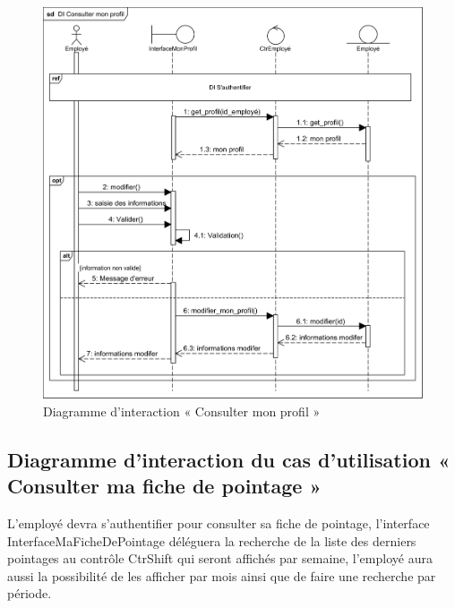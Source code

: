 \begin{figure}[h!]
    \centering
    \includegraphics[scale=0.86]{images/DS/consulter_mon_profile}
    \caption{Diagramme d'interaction « Consulter mon profil »}
    \label{fig35}
\end{figure}

\clearpage
    
\subsection*{Diagramme d'interaction du cas d'utilisation « Consulter ma fiche de pointage »}
L’employé devra s’authentifier pour consulter sa fiche de pointage, l’interface 
InterfaceMaFicheDePointage déléguera la recherche de la liste des derniers 
pointages au contrôle CtrShift qui seront affichés par semaine, l’employé aura 
aussi la possibilité de les afficher par mois ainsi que de faire une recherche 
par période. 
        
